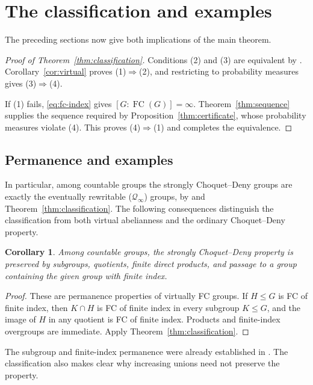 \documentclass[11pt,letterpaper]{amsart}
\newtheorem{corollary}[theorem]{Corollary}
\theoremstyle{definition}
\theoremstyle{remark}
\DeclareMathOperator{\FC}{FC}
\begin{document}
\section{The classification and examples}\label{sec:examples}
The preceding sections now give both implications of the main theorem.

\begin{proof}[Proof of Theorem~\ref{thm:classification}]
Conditions (2) and (3) are equivalent by
\cite[Theorem~4.2]{DD}. Corollary~\ref{cor:virtual} proves
(1)$\Rightarrow$(2), and restricting to probability measures gives
(3)$\Rightarrow$(4).

If (1) fails, \eqref{eq:fc-index} gives $[G:\FC(G)]=\infty$.
Theorem~\ref{thm:sequence} supplies the sequence required by
Proposition~\ref{thm:certificate}, whose probability measures violate
(4). This proves (4)$\Rightarrow$(1) and completes the equivalence.
\end{proof}

\subsection{Permanence and examples}
In particular, among countable groups the strongly Choquet--Deny groups
are exactly the eventually rewritable ($\mathcal Q_\infty$) groups, by
\cite[Proposition~2]{BR} and Theorem~\ref{thm:classification}.
The following consequences distinguish the classification from both
virtual abelianness and the ordinary Choquet--Deny property.

\begin{corollary}\label{cor:permanence}
Among countable groups, the strongly Choquet--Deny property is preserved
by subgroups, quotients, finite direct products, and passage to a group
containing the given group with finite index.
\end{corollary}
\begin{proof}
These are permanence properties of virtually FC groups. If $H\leq G$
is FC of finite index, then $K\cap H$ is FC of finite index in every
subgroup $K\leq G$, and the image of $H$ in any quotient is FC of
finite index. Products and finite-index overgroups are immediate.
Apply Theorem~\ref{thm:classification}.
\end{proof}

The subgroup and finite-index permanence were already established in
\cite[Proposition 5.1]{DD}. The classification also makes clear why
increasing unions need not preserve the property.
\end{document}

